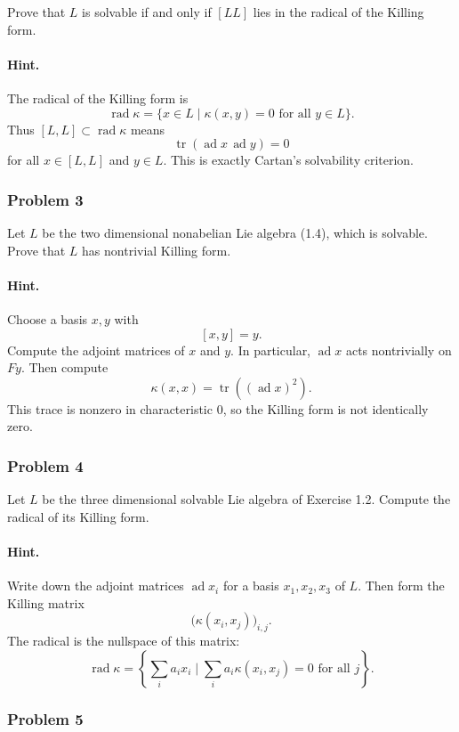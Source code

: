 \documentclass[12pt, a4paper]{article}
\begin{document}
Prove that \(L\) is solvable if and only if \([LL]\) lies in the radical of the
Killing form.

\paragraph{Hint.}
The radical of the Killing form is
\[
\operatorname{rad}\kappa
=
\{x\in L\mid \kappa(x,y)=0\text{ for all }y\in L\}.
\]
Thus \([L,L]\subset \operatorname{rad}\kappa\) means
\[
\operatorname{tr}(\operatorname{ad}x\,\operatorname{ad}y)=0
\]
for all \(x\in [L,L]\) and \(y\in L\). This is exactly Cartan's solvability
criterion.

\subsubsection{Problem 3}

Let \(L\) be the two dimensional nonabelian Lie algebra (1.4), which is
solvable. Prove that \(L\) has nontrivial Killing form.

\paragraph{Hint.}
Choose a basis \(x,y\) with
\[
[x,y]=y.
\]
Compute the adjoint matrices of \(x\) and \(y\). In particular,
\(\operatorname{ad}x\) acts nontrivially on \(Fy\). Then compute
\[
\kappa(x,x)=\operatorname{tr}((\operatorname{ad}x)^2).
\]
This trace is nonzero in characteristic \(0\), so the Killing form is not
identically zero.

\subsubsection{Problem 4}

Let \(L\) be the three dimensional solvable Lie algebra of Exercise 1.2.
Compute the radical of its Killing form.

\paragraph{Hint.}
Write down the adjoint matrices \(\operatorname{ad}x_i\) for a basis
\(x_1,x_2,x_3\) of \(L\). Then form the Killing matrix
\[
\bigl(\kappa(x_i,x_j)\bigr)_{i,j}.
\]
The radical is the nullspace of this matrix:
\[
\operatorname{rad}\kappa
=
\left\{\sum_i a_i x_i \mid
\sum_i a_i\kappa(x_i,x_j)=0
\text{ for all }j
\right\}.
\]

\subsubsection{Problem 5}
\end{document}
